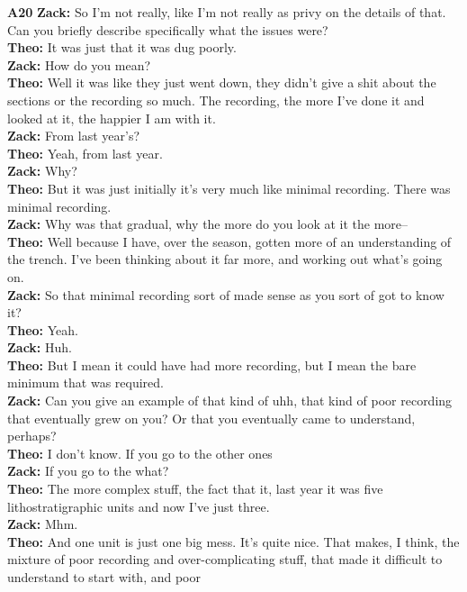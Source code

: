 \documentclass{article}
\begin{document}
\noindent\textbf{A20}\label{sec-A20}\newline
\textbf{Zack:} So I'm not really, like I'm not really as privy on the
details of that. Can you briefly describe specifically what the issues
were?\\
\textbf{Theo:} It was just that it was dug poorly.\\
\textbf{Zack:} How do you mean?\\
\textbf{Theo:} Well it was like they just went down, they didn't give a
shit about the sections or the recording so much. The recording, the
more I've done it and looked at it, the happier I am with it.\\
\textbf{Zack:} From last year's?\\
\textbf{Theo:} Yeah, from last year.\\
\textbf{Zack:} Why?\\
\textbf{Theo:} But it was just initially it's very much like minimal
recording. There was minimal recording.\\
\textbf{Zack:} Why was that gradual, why the more do you look at it the
more--\\
\textbf{Theo:} Well because I have, over the season, gotten more of an
understanding of the trench. I've been thinking about it far more, and
working out what's going on.\\
\textbf{Zack:} So that minimal recording sort of made sense as you sort
of got to know it?\\
\textbf{Theo:} Yeah.\\
\textbf{Zack:} Huh.\\
\textbf{Theo:} But I mean it could have had more recording, but I mean
the bare minimum that was required.\\
\textbf{Zack:} Can you give an example of that kind of uhh, that kind of
poor recording that eventually grew on you? Or that you eventually came
to understand, perhaps?\\
\textbf{Theo:} I don't know. If you go to the other ones\\
\textbf{Zack:} If you go to the what?\\
\textbf{Theo:} The more complex stuff, the fact that it, last year it
was five lithostratigraphic units and now I've just three.\\
\textbf{Zack:} Mhm.\\
\textbf{Theo:} And one unit is just one big mess. It's quite nice. That
makes, I think, the mixture of poor recording and over-complicating
stuff, that made it difficult to understand to start with, and poor
\end{document}
